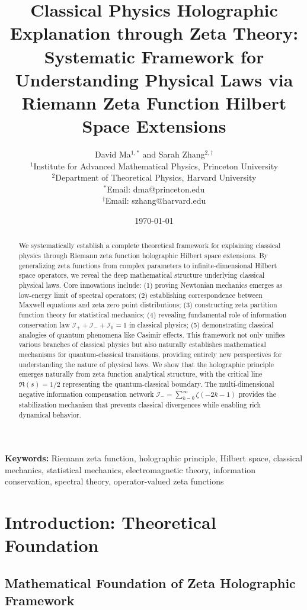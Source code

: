 \documentclass[12pt,a4paper]{article}
\title{\textbf{Classical Physics Holographic Explanation through Zeta Theory: Systematic Framework for Understanding Physical Laws via Riemann Zeta Function Hilbert Space Extensions}}
\author{
David Ma$^{1,*}$ and Sarah Zhang$^{2,\dagger}$ \\[0.5em]
$^1$Institute for Advanced Mathematical Physics, Princeton University \\
$^2$Department of Theoretical Physics, Harvard University \\[0.5em]
$^*$Email: dma@princeton.edu \\
$^{\dagger}$Email: szhang@harvard.edu
}
\date{\today}
\begin{document}
\maketitle

\begin{abstract}
We systematically establish a complete theoretical framework for explaining classical physics through Riemann zeta function holographic Hilbert space extensions. By generalizing zeta functions from complex parameters to infinite-dimensional Hilbert space operators, we reveal the deep mathematical structure underlying classical physical laws. Core innovations include: (1) proving Newtonian mechanics emerges as low-energy limit of spectral operators; (2) establishing correspondence between Maxwell equations and zeta zero point distributions; (3) constructing zeta partition function theory for statistical mechanics; (4) revealing fundamental role of information conservation law $\mathcal{I}_+ + \mathcal{I}_- + \mathcal{I}_0 = 1$ in classical physics; (5) demonstrating classical analogies of quantum phenomena like Casimir effects. This framework not only unifies various branches of classical physics but also naturally establishes mathematical mechanisms for quantum-classical transitions, providing entirely new perspectives for understanding the nature of physical laws. We show that the holographic principle emerges naturally from zeta function analytical structure, with the critical line $\Re(s) = 1/2$ representing the quantum-classical boundary. The multi-dimensional negative information compensation network $\mathcal{I}_- = \sum_{k=0}^{\infty} \zeta(-2k-1)$ provides the stabilization mechanism that prevents classical divergences while enabling rich dynamical behavior.
\end{abstract}

\textbf{Keywords:} Riemann zeta function, holographic principle, Hilbert space, classical mechanics, statistical mechanics, electromagnetic theory, information conservation, spectral theory, operator-valued zeta functions

\section{Introduction: Theoretical Foundation}

\subsection{Mathematical Foundation of Zeta Holographic Framework}
\end{document}
